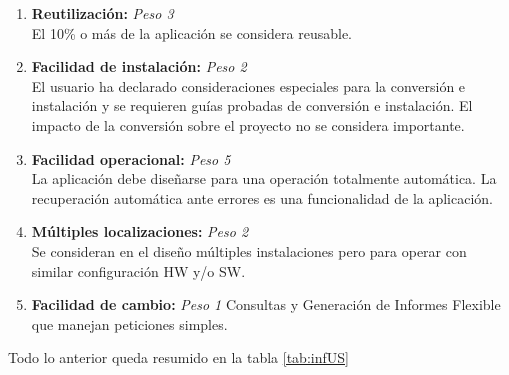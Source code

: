 \documentclass[11pt,a4paper,spanish,twoside]{book}
\begin{document}
\begin{enumerate}[{\bf 1.}]
\item {\bf Reutilización:} \emph{Peso 3} \\ El 10\% o más de la aplicación se
  considera reusable. 

\item {\bf Facilidad de instalación:} \emph{Peso 2} \\ El usuario ha declarado
  consideraciones especiales para la conversión e instalación y se requieren
  guías probadas de conversión e instalación. El impacto de la conversión
  sobre el proyecto no se considera importante. 

\item {\bf Facilidad operacional:} \emph{Peso 5} \\ La aplicación debe diseñarse
  para una operación totalmente automática. La recuperación automática ante
  errores es una funcionalidad de la aplicación. 

\item {\bf Múltiples localizaciones:} \emph{Peso 2} \\ Se consideran en el
  diseño múltiples instalaciones pero para operar con similar configuración HW
  y/o SW.

\item {\bf Facilidad de cambio:} \emph{Peso 1} Consultas y Generación de
  Informes Flexible que manejan peticiones simples.

\end{enumerate}

Todo lo anterior queda resumido en la tabla \ref{tab:infUS}
\end{document}
